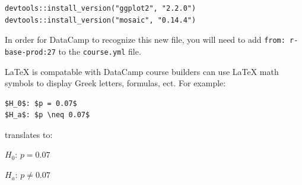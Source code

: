 \documentclass[12pt]{article}
\begin{document}
\begin{verbatim}
devtools::install_version("ggplot2", "2.2.0")
devtools::install_version("mosaic", "0.14.4")
\end{verbatim}
In order for DataCamp to recognize this new file, you will need to add \texttt{from: r-base-prod:27} to the \texttt{course.yml} file.

LaTeX is compatable with DataCamp course builders can use LaTeX math symbols to display Greek letters, formulas, ect. For example:
\begin{verbatim}
$H_0$: $p = 0.07$
$H_a$: $p \neq 0.07$
\end{verbatim}

translates to:

$H_0$: $p = 0.07$

$H_a$: $p \neq 0.07$







%


\end{document}
